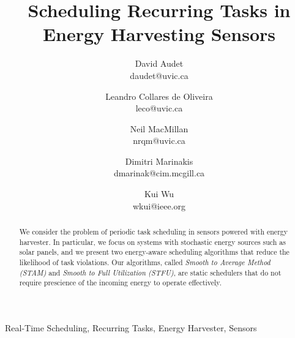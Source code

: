 \documentclass[10pt,conference]{IEEEtran}
\begin{document}
\title{Scheduling Recurring Tasks in Energy Harvesting Sensors}
\author{David Audet\\daudet@uvic.ca \and Leandro {Collares de Oliveira}\\leco@uvic.ca \and Neil MacMillan\\nrqm@uvic.ca \and Dimitri Marinakis\\dmarinak@cim.mcgill.ca \and Kui Wu\\wkui@ieee.org}

\maketitle


\begin{abstract}

We consider the problem of periodic task scheduling in sensors powered with energy harvester. In particular, we focus on systems with stochastic energy sources such as solar panels, and we present two energy-aware scheduling algorithms that reduce the likelihood of task violations. Our algorithms, called \emph{Smooth to Average Method (STAM)} and \emph{Smooth to Full Utilization (STFU)}, are static schedulers that do not require prescience of the incoming energy to operate effectively.
\end{abstract}

\begin{IEEEkeywords} Real-Time Scheduling, Recurring Tasks, Energy Harvester, Sensors
\end{IEEEkeywords}

























\end{document}
